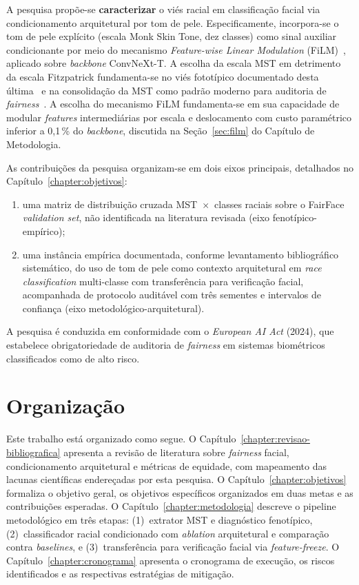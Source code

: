 A pesquisa propõe-se \textbf{caracterizar} o viés racial em classificação facial via condicionamento arquitetural por tom de pele. Especificamente, incorpora-se o tom de pele explícito (escala Monk Skin Tone, dez classes) como sinal auxiliar condicionante por meio do mecanismo \emph{Feature-wise Linear Modulation} (FiLM)~\cite{perez2018film}, aplicado sobre \emph{backbone} ConvNeXt-T. A escolha da escala MST em detrimento da escala Fitzpatrick fundamenta-se no viés fototípico documentado desta última~\cite{fitzpatrick1988validity} e na consolidação da MST como padrão moderno para auditoria de \emph{fairness}~\cite{schumann2023consensus,matias2026large}. A escolha do mecanismo FiLM fundamenta-se em sua capacidade de modular \emph{features} intermediárias por escala e deslocamento com custo paramétrico inferior a 0,1\,\% do \emph{backbone}, discutida na Seção~\ref{sec:film} do Capítulo de Metodologia.

As contribuições da pesquisa organizam-se em dois eixos principais, detalhados no Capítulo~\ref{chapter:objetivos}:

\begin{enumerate}[label=(\roman*)]
\item uma matriz de distribuição cruzada MST~$\times$~classes raciais sobre o FairFace \emph{validation set}, não identificada na literatura revisada (eixo fenotípico-empírico);
\item uma instância empírica documentada, conforme levantamento bibliográfico sistemático, do uso de tom de pele como contexto arquitetural em \emph{race classification} multi-classe com transferência para verificação facial, acompanhada de protocolo auditável com três sementes e intervalos de confiança (eixo metodológico-arquitetural).
\end{enumerate}

A pesquisa é conduzida em conformidade com o \emph{European AI Act} (2024), que estabelece obrigatoriedade de auditoria de \emph{fairness} em sistemas biométricos classificados como de alto risco.

\section{Organização}
\label{sec:intro_organizacao}

Este trabalho está organizado como segue. O Capítulo~\ref{chapter:revisao-bibliografica} apresenta a revisão de literatura sobre \emph{fairness} facial, condicionamento arquitetural e métricas de equidade, com mapeamento das lacunas científicas endereçadas por esta pesquisa. O Capítulo~\ref{chapter:objetivos} formaliza o objetivo geral, os objetivos específicos organizados em duas metas e as contribuições esperadas. O Capítulo~\ref{chapter:metodologia} descreve o pipeline metodológico em três etapas: (1)~extrator MST e diagnóstico fenotípico, (2)~classificador racial condicionado com \emph{ablation} arquitetural e comparação contra \emph{baselines}, e (3)~transferência para verificação facial via \emph{feature-freeze}. O Capítulo~\ref{chapter:cronograma} apresenta o cronograma de execução, os riscos identificados e as respectivas estratégias de mitigação.